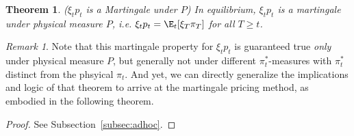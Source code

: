 \documentclass[12pt]{article}
\theoremstyle{plain}
\newtheorem{thm}{Theorem}[section]
\theoremstyle{definition}
\theoremstyle{remark}
\newtheorem*{rmk}{Remark}
\begin{document}
\begin{thm}
\emph{($\xi_tp_t$ is a Martingale under $P$)}
In equilibrium, $\xi_tp_t$ is a martingale under physical measure $P$,
i.e.  $\xi_tp_t=\E_t[\xi_T\pi_T]$ for all $T\geq t$.
\end{thm}
\begin{rmk}
Note that this martingale property for $\xi_tp_t$ is guaranteed true
\emph{only} under physical measure $P$, but generally not under
different $\pi^*_t$-measures with $\pi^*_t$ distinct from the phsyical
$\pi_t$.
And yet, we can directly generalize the implications and logic of that
theorem to arrive at the martingale pricing method, as embodied in the
following theorem.
\end{rmk}
\begin{proof}
See Subsection~\ref{subsec:adhoc}.
\end{proof}
\end{document}

